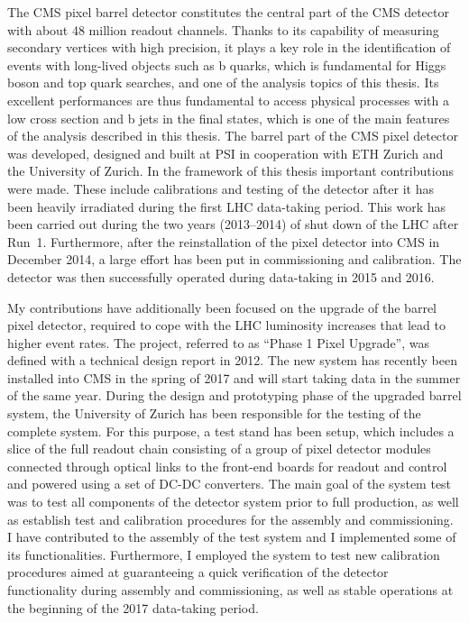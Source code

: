 The CMS pixel barrel detector constitutes the central part of the CMS detector with about 48 million readout channels. Thanks to its capability of measuring secondary vertices with high precision,
it plays a key role in the identification of events with long-lived objects such as b quarks, which is fundamental for Higgs boson and top quark searches, and one of the analysis topics of this thesis.
Its excellent performances are thus fundamental to access physical processes with a low cross section and b jets in the final states, which is one of the main features of the analysis described in this thesis.
The barrel part of the CMS pixel detector was developed, designed and built at PSI in cooperation with ETH Zurich and the University of Zurich.
In the framework of this thesis important contributions were made. These include calibrations and testing of the detector after it has been heavily irradiated during the first LHC data-taking period.
This work has been carried out during the two years (2013--2014) of shut down of the LHC after Run~1. Furthermore, after the reinstallation of the pixel detector into CMS in December 2014,
a large effort has been put in commissioning and calibration. The detector was then successfully operated during data-taking in 2015 and 2016.

My contributions have additionally been focused on the upgrade of the barrel pixel detector, required to cope with the LHC luminosity increases that lead to higher event rates.
The project, referred to as ``Phase 1 Pixel Upgrade'', was defined with a technical design report in 2012. The new system has recently been installed into CMS in the spring of 2017
and will start taking data in the summer of the same year.
During the design and prototyping phase of the upgraded barrel system, the University of Zurich has been responsible for the testing of the complete system.
For this purpose, a test stand has been setup, which includes a slice of the full readout chain consisting of a group of pixel detector modules connected through optical links to the front-end boards for readout and control and powered using a set of DC-DC converters. The main goal of the system test was to test all components of the detector system prior to full production, as well as establish test and calibration procedures for the assembly and commissioning. I have contributed to the assembly of the test system and I implemented some of its functionalities. Furthermore, I employed the system to test new calibration procedures
aimed at guaranteeing a quick verification of the detector functionality during assembly and commissioning, as well as stable operations at the beginning of the 2017 data-taking period.\\

